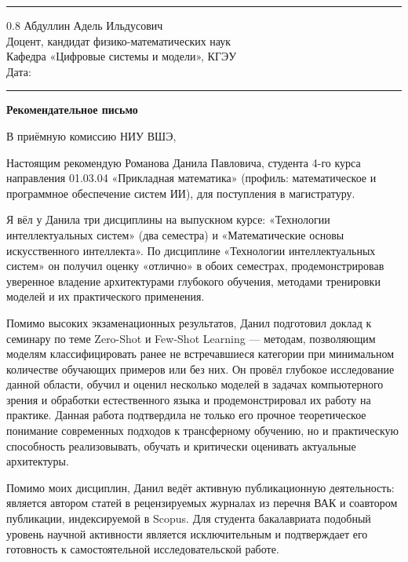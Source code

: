\documentclass[a4paper,12pt]{article}
\begin{document}
\vspace{4pt}
\noindent\rule{\textwidth}{0.8pt}

\begin{flushright}
  \begin{spacing}{0.8}
    Абдуллин Адель Ильдусович\\
    Доцент, кандидат физико-математических наук\\
    Кафедра «Цифровые системы и модели», КГЭУ\\[6pt]
    Дата: \rule{4cm}{0.4pt}
  \end{spacing}
\end{flushright}

\begin{center}
  {\Large\bfseries Рекомендательное письмо}
\end{center}

В приёмную комиссию НИУ ВШЭ,

Настоящим рекомендую Романова Данила Павловича, студента 4-го курса направления 01.03.04 «Прикладная математика» (профиль: ма\-те\-ма\-ти\-че\-ское и про\-грамм\-ное обес\-пе\-че\-ние систем ИИ), для по\-сту\-пле\-ния в ма\-ги\-стра\-ту\-ру.

Я вёл у Данила три дисциплины на выпускном курсе: «Технологии интеллектуальных систем» (два семестра) и «Математические основы искусственного интеллекта». По дисциплине «Технологии интеллектуальных систем» он получил оценку «отлично» в обоих семестрах, продемонстрировав уверенное владение архитектурами глубокого обучения, методами тренировки моделей и их практического применения.

Помимо высоких экзаменационных результатов, Данил подготовил доклад к семинару по теме Zero-Shot и Few-Shot Learning --- методам, позволяющим моделям классифицировать ранее не встречавшиеся категории при минимальном количестве обучающих примеров или без них. Он провёл глубокое исследование данной области, обучил и оценил несколько моделей в задачах компьютерного зрения и обработки естественного языка и продемонстрировал их работу на практике. Данная работа подтвердила не только его прочное теоретическое понимание современных подходов к трансферному обучению, но и практическую способность реализовывать, обучать и критически оценивать актуальные архитектуры.

Помимо моих дисциплин, Данил ведёт активную публикационную деятельность: является автором статей в рецензируемых журналах из перечня ВАК и соавтором публикации, индексируемой в Scopus. Для студента бакалавриата подобный уровень научной активности является исключительным и подтверждает его готовность к самостоятельной исследовательской работе.
\end{document}
